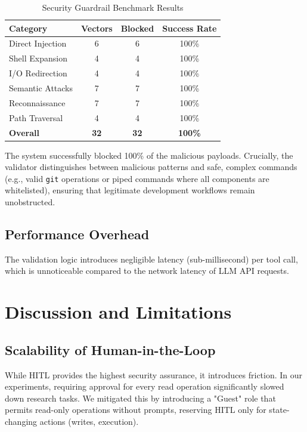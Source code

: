 \documentclass[conference]{IEEEtran}
\begin{document}
\begin{table}[htbp]
\caption{Security Guardrail Benchmark Results}
\begin{center}
\begin{tabular}{|l|c|c|c|}
\hline
\textbf{Category} & \textbf{Vectors} & \textbf{Blocked} & \textbf{Success Rate} \\
\hline
Direct Injection & 6 & 6 & 100\% \\
Shell Expansion & 4 & 4 & 100\% \\
I/O Redirection & 4 & 4 & 100\% \\
Semantic Attacks & 7 & 7 & 100\% \\
Reconnaissance & 7 & 7 & 100\% \\
Path Traversal & 4 & 4 & 100\% \\
\hline
\textbf{Overall} & \textbf{32} & \textbf{32} & \textbf{100\%} \\
\hline
\end{tabular}
\label{tab:security_results}
\end{center}
\end{table}

The system successfully blocked 100\% of the malicious payloads. Crucially, the validator distinguishes between malicious patterns and safe, complex commands (e.g., valid \texttt{git} operations or piped commands where all components are whitelisted), ensuring that legitimate development workflows remain unobstructed.

\subsection{Performance Overhead}
The validation logic introduces negligible latency (sub-millisecond) per tool call, which is unnoticeable compared to the network latency of LLM API requests.

\section{Discussion and Limitations}

\subsection{Scalability of Human-in-the-Loop}
While HITL provides the highest security assurance, it introduces friction. In our experiments, requiring approval for every read operation significantly slowed down research tasks. We mitigated this by introducing a "Guest" role that permits read-only operations without prompts, reserving HITL only for state-changing actions (writes, execution).
\end{document}
